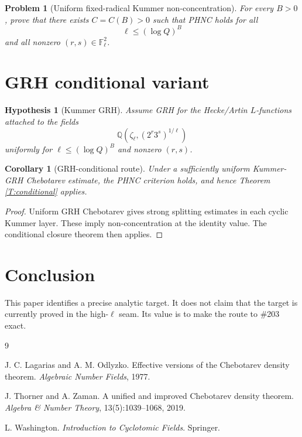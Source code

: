 \documentclass[11pt]{article}
\newtheorem{corollary}{Corollary}
\newtheorem{hypothesis}{Hypothesis}
\newtheorem{problem}{Problem}
\newcommand{\Q}{\mathbb Q}
\newcommand{\F}{\mathbb F}
\newcommand{\1}{\mathbf 1}
\begin{document}
\begin{problem}[Uniform fixed-radical Kummer non-concentration]
For every \(B>0\), prove that there exists \(C=C(B)>0\) such that PHNC holds for all
\[
\ell\le(\log Q)^B
\]
and all nonzero \((r,s)\in\F_\ell^2\).
\end{problem}

\section{GRH conditional variant}

\begin{hypothesis}[Kummer GRH]
Assume GRH for the Hecke/Artin \(L\)-functions attached to the fields
\[
\Q(\zeta_\ell,(2^r3^s)^{1/\ell})
\]
uniformly for \(\ell\le(\log Q)^B\) and nonzero \((r,s)\).
\end{hypothesis}

\begin{corollary}[GRH-conditional route]
Under a sufficiently uniform Kummer-GRH Chebotarev estimate, the PHNC criterion holds, and hence Theorem \ref{T:conditional} applies.
\end{corollary}

\begin{proof}
Uniform GRH Chebotarev gives strong splitting estimates in each cyclic Kummer layer.  These imply non-concentration at the identity value.  The conditional closure theorem then applies.
\end{proof}

\section{Conclusion}

This paper identifies a precise analytic target.  It does not claim that the target is currently proved in the high-\(\ell\) seam.  Its value is to make the route to \#203 exact.


\begin{thebibliography}{9}

J. C. Lagarias and A. M. Odlyzko.
\newblock Effective versions of the Chebotarev density theorem.
\newblock \emph{Algebraic Number Fields}, 1977.

J. Thorner and A. Zaman.
\newblock A unified and improved Chebotarev density theorem.
\newblock \emph{Algebra \& Number Theory}, 13(5):1039--1068, 2019.

L. Washington.
\newblock \emph{Introduction to Cyclotomic Fields}.
\newblock Springer.

\end{thebibliography}
\end{document}

